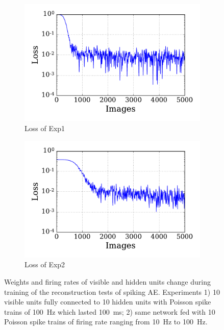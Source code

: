 \begin{figure}
\begin{subfigure}[t]{0.48\textwidth}
		\DIFaddendFL \includegraphics[width=\textwidth]{pics_sdlm/00_exp_SAE_Orig/exp1_mse_nons.pdf}
		\caption{Loss of Exp1}
	\end{subfigure}
	\DIFdelbeginFL %
\DIFdelendFL \DIFaddbeginFL \begin{subfigure}[t]{0.48\textwidth}
		\DIFaddendFL \includegraphics[width=\textwidth]{pics_sdlm/00_exp_SAE_Orig/exp2_mse_nons.pdf}
		\caption{Loss of Exp2}
	\end{subfigure}
	\caption{Weights and firing rates of visible and hidden units change during training of the reconstruction tests of spiking AE. 
		Experiments 1) 10 visible units fully connected to 10 hidden units with Poisson spike trains of 100~Hz which lasted 100~ms; 2) \DIFaddbeginFL {}\DIFaddendFL same network fed with 10 Poisson spike trains of firing rate ranging from 10~Hz to 100~Hz.}
	\label{fig:SAE_orig}
\end{figure}

